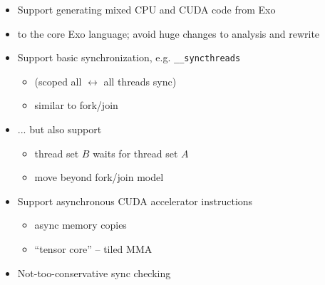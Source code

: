 \begin{minipage}[t]{0.48\textwidth}\fixminipage
{}  %

\begin{itemize}
\item Support generating mixed CPU and CUDA code from Exo
\item {} to the core Exo language; avoid huge changes to analysis and rewrite
\item Support basic synchronization, e.g. \texttt{\_\_syncthreads}
\begin{itemize}
  \item (scoped all $\leftrightarrow$ all threads sync)
  \item similar to fork/join
\end{itemize}
\item ... but also support 
\begin{itemize}
  \item thread set $B$ waits for thread set $A$
  \item move beyond fork/join model
\end{itemize}
\item Support asynchronous CUDA accelerator instructions
\begin{itemize}
  \item async memory copies
  \item ``tensor core'' -- tiled MMA
\end{itemize}
\item Not-too-conservative sync checking
\end{itemize}
\end{minipage} %
\hfill
